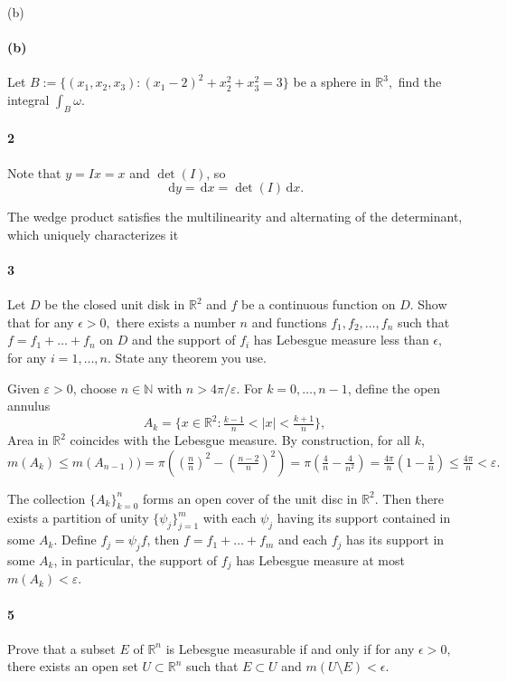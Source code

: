 \documentclass[12pt]{article}
\newenvironment{fullbox}{\begin{lrbox}{\savefullbox}\begin{minipage}{\dimexpr\textwidth-2\fboxsep\relax}}{\end{minipage}\end{lrbox}\begin{center}\framebox[\textwidth]{\usebox{\savefullbox}}\end{center}}
\newenvironment{pbox}[1][]{\begin{fullbox}\ifx#1\empty\else\paragraph{#1}\fi}{\end{fullbox}}
\newcommand{\N}{\mathbb{N}}
\newcommand{\R}{\mathbb{R}}
\newcommand{\eps}{\varepsilon}
\newcommand{\<}{\langle}
\renewcommand{\>}{\rangle}
\newcommand{\dd}[1]{\,\mathrm{d}#1}
\begin{document}
\begin{pbox}[(b)]
    Let $B:=\{(x_1, x_2, x_3): (x_1-2)^2+x_2^2+x_3^2=3\}$ be a sphere in $\mathbb R^3,$ find the integral $\int_B \omega.$
\end{pbox}





\newpage
\begin{pbox}[2]
    
\end{pbox}

Note that $y = Ix = x$ and $\det(I)$, so
\[
    \dd{y} = \dd{x} = \det(I)\dd{x}.
\]



The wedge product satisfies the multilinearity and alternating of the determinant, which uniquely characterizes it


\newpage
\begin{pbox}[3]
    Let $D$ be the closed unit disk in $\mathbb R^2$ and $f$ be a continuous function on $D.$ Show that for any $\epsilon >0,$ there exists a number $n$ and functions $f_1, f_2, \ldots, f_n$ such that $f=f_1+\ldots+f_n$ on $D$ and the support of $f_i$ has Lebesgue measure less than $\epsilon,$ for any $i =1, \ldots, n.$ State any theorem you use.
\end{pbox}

Given $\eps > 0$, choose $n \in \N$ with $n > 4\pi/\eps$. For $k = 0, \dots, n - 1$, define the open annulus
\[
    A_k = \{x \in \R^2 : \tfrac{k - 1}{n} < |x| <  \tfrac{k + 1}{n} \},
\]
Area in $\R^2$ coincides with the Lebesgue measure. By construction, for all $k$,
\[
    m(A_k)
        \leq m(A_{n-1}))
        = \pi\left((\tfrac{n}{n})^2 - (\tfrac{n-2}{n})^2\right)
        = \pi\left(\tfrac{4}{n} - \tfrac{4}{n^2}\right)
        = \tfrac{4\pi}{n}(1 - \tfrac{1}{n})
        \leq \tfrac{4\pi}{n}
        < \eps.
\]

The collection $\{A_k\}_{k = 0}^{n}$ forms an open cover of the unit disc in $\R^2$. Then there exists a partition of unity $\{\psi_j\}_{j=1}^{m}$ with each $\psi_j$ having its support contained in some $A_k$. Define $f_j = \psi_j f$, then  $f = f_1 + \dots + f_m$ and each $f_j$ has its support in some $A_k$, in particular, the support of $f_j$ has Lebesgue measure at most $m(A_k) < \eps$.


\newpage
\begin{pbox}[5]
    Prove that a subset $E$ of $\mathbb R^n$ is Lebesgue measurable if and only if for any $\epsilon >0,$ there exists an open set $U\subset \mathbb R^n$ such that $E\subset U$ and $m(U\setminus E)<\epsilon.$
\end{pbox}
\end{document}
